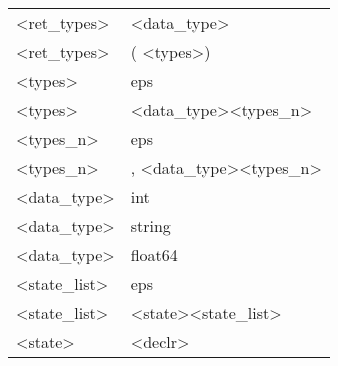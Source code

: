 \documentclass{article}
\begin{document}
\begin{table}[]
\begin{tabular}{l|l}
\textless{}ret\_types\textgreater{}     & \textless{}data\_type\textgreater{}                                                                                                                  \\
\textless{}ret\_types\textgreater{}     & ( \textless{}types\textgreater )                                                                                                                     \\
\textless{}types\textgreater{}          & eps                                                                                                                                                  \\
\textless{}types\textgreater{}          & \textless{}data\_type\textgreater \textless{}types\_n\textgreater{}                                                                                  \\
\textless{}types\_n\textgreater{}       & eps                                                                                                                                                  \\
\textless{}types\_n\textgreater{}       & , \textless{}data\_type\textgreater \textless{}types\_n\textgreater{}                                                                                \\
\textless{}data\_type\textgreater{}     & int                                                                                                                                                  \\
\textless{}data\_type\textgreater{}     & string                                                                                                                                               \\
\textless{}data\_type\textgreater{}     & float64                                                                                                                                              \\
\textless{}state\_list\textgreater{}    & eps                                                                                                                                                  \\
\textless{}state\_list\textgreater{}    & \textless{}state\textgreater \textless{}state\_list\textgreater{}                                                                                    \\
\textless{}state\textgreater{}          & \textless{}declr\textgreater{}                                                                                                                       \\

\end{tabular}
\end{table}
\end{document}
